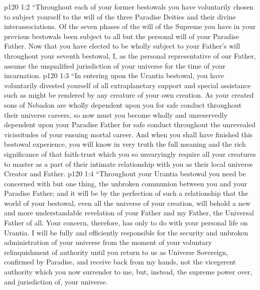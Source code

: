 \vs p120 1:2 “Throughout each of your former bestowals you have voluntarily chosen to subject yourself to the will of the three Paradise Deities and their divine interassociations. Of the seven phases of the will of the Supreme you have in your previous bestowals been subject to all but the personal will of your Paradise Father. Now that you have elected to be wholly subject to your Father’s will throughout your seventh bestowal, I, as the personal representative of our Father, assume the unqualified jurisdiction of your universe for the time of your incarnation.
\vs p120 1:3 “In entering upon the Urantia bestowal, you have voluntarily divested yourself of all extraplanetary support and special assistance such as might be rendered by any creature of your own creation. As your created sons of Nebadon are wholly dependent upon you for safe conduct throughout their universe careers, so now must you become wholly and unreservedly dependent upon your Paradise Father for safe conduct throughout the unrevealed vicissitudes of your ensuing mortal career. And when you shall have finished this bestowal experience, you will know in very truth the full meaning and the rich significance of that faith\hyp{}trust which you so unvaryingly require all your creatures to master as a part of their intimate relationship with you as their local universe Creator and Father.
\vs p120 1:4 “Throughout your Urantia bestowal you need be concerned with but one thing, the unbroken communion between you and your Paradise Father; and it will be by the perfection of such a relationship that the world of your bestowal, even all the universe of your creation, will behold a new and more understandable revelation of your Father and my Father, the Universal Father of all. Your concern, therefore, has only to do with your personal life on Urantia. I will be fully and efficiently responsible for the security and unbroken administration of your universe from the moment of your voluntary relinquishment of authority until you return to us as Universe Sovereign, confirmed by Paradise, and receive back from my hands, not the vicegerent authority which you now surrender to me, but, instead, the supreme power over, and jurisdiction of, your universe.
